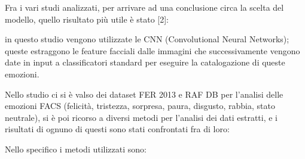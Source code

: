 Fra i vari studi analizzati, per arrivare ad una conclusione circa la scelta del modello, quello risultato più utile è stato [2]: 

in questo studio vengono utilizzate le CNN (Convolutional Neural Networks); queste estraggono le feature facciali dalle immagini che successivamente vengono date in input a classificatori standard per eseguire la catalogazione di queste emozioni.

Nello studio ci si è valso dei dataset FER 2013 e RAF DB per l’analisi delle emozioni FACS (felicità, tristezza, sorpresa, paura, disgusto, rabbia, stato neutrale), si è poi ricorso a diversi metodi per l’analisi dei dati estratti, e i risultati di ognuno di questi sono stati confrontati fra di loro:

Nello specifico i metodi utilizzati sono:

